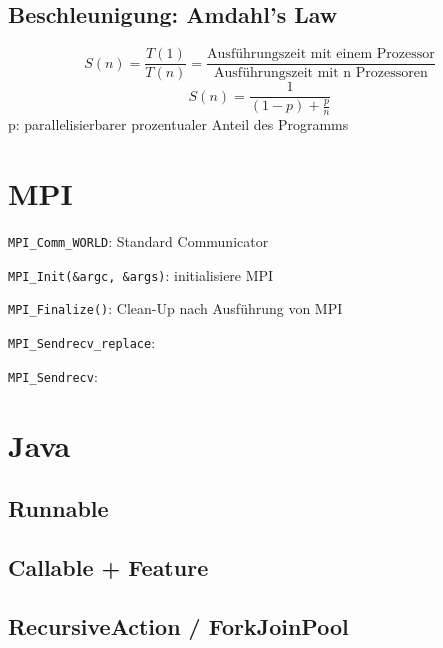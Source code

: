 \subsection{Beschleunigung: Amdahl's Law }
$$S(n) = \frac{T(1)}{T(n)}=\frac{\text{Ausführungszeit mit einem Prozessor}}{\text{Ausführungszeit mit n Prozessoren}}$$
$$S(n)= \frac{1}{(1-p)+ \frac{p}{n}}$$
p: parallelisierbarer prozentualer Anteil des Programms

\section{MPI}
\begin{compactitem}
	\item \texttt{MPI\_Comm\_WORLD}: Standard Communicator	
	\item \texttt{MPI\_Init(\&argc, \&args)}: initialisiere MPI
	\item \texttt{MPI\_Finalize()}: Clean-Up nach Ausführung von MPI
	\item \texttt{MPI\_Sendrecv\_replace}: \open
	\item \texttt{MPI\_Sendrecv}: \open
\end{compactitem}

\newpage
\section{Java}
\subsection{Runnable}
\label{javaRunnable}


\newpage
\subsection{Callable + Feature}
\label{javaRunnable}


\newpage
\subsection{RecursiveAction / ForkJoinPool}
\label{javaRunnable}


